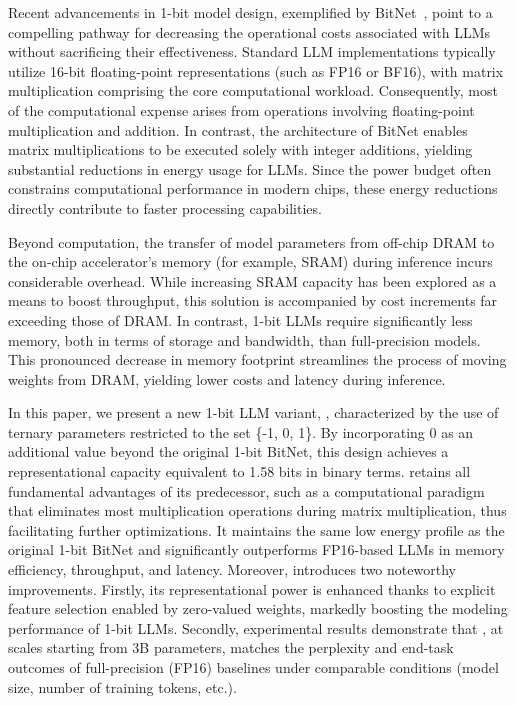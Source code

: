 Recent advancements in 1-bit model design, exemplified by BitNet~\cite{bitnet}, point to a compelling pathway for decreasing the operational costs associated with LLMs without sacrificing their effectiveness. Standard LLM implementations typically utilize 16-bit floating-point representations (such as FP16 or BF16), with matrix multiplication comprising the core computational workload. Consequently, most of the computational expense arises from operations involving floating-point multiplication and addition. In contrast, the architecture of BitNet enables matrix multiplications to be executed solely with integer additions, yielding substantial reductions in energy usage for LLMs. Since the power budget often constrains computational performance in modern chips, these energy reductions directly contribute to faster processing capabilities.

Beyond computation, the transfer of model parameters from off-chip DRAM to the on-chip accelerator’s memory (for example, SRAM) during inference incurs considerable overhead. While increasing SRAM capacity has been explored as a means to boost throughput, this solution is accompanied by cost increments far exceeding those of DRAM. In contrast, 1-bit LLMs require significantly less memory, both in terms of storage and bandwidth, than full-precision models. This pronounced decrease in memory footprint streamlines the process of moving weights from DRAM, yielding lower costs and latency during inference.

In this paper, we present a new 1-bit LLM variant, \textbf{}, characterized by the use of ternary parameters restricted to the set \{-1, 0, 1\}. By incorporating 0 as an additional value beyond the original 1-bit BitNet, this design achieves a representational capacity equivalent to 1.58 bits in binary terms.  retains all fundamental advantages of its predecessor, such as a computational paradigm that eliminates most multiplication operations during matrix multiplication, thus facilitating further optimizations. It maintains the same low energy profile as the original 1-bit BitNet and significantly outperforms FP16-based LLMs in memory efficiency, throughput, and latency. Moreover,  introduces two noteworthy improvements. Firstly, its representational power is enhanced thanks to explicit feature selection enabled by zero-valued weights, markedly boosting the modeling performance of 1-bit LLMs. Secondly, experimental results demonstrate that , at scales starting from 3B parameters, matches the perplexity and end-task outcomes of full-precision (FP16) baselines under comparable conditions (model size, number of training tokens, etc.).

